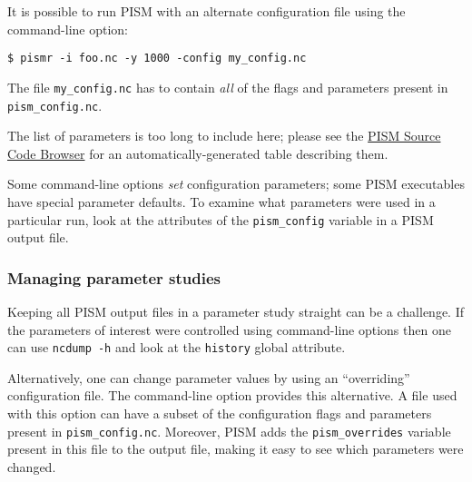 It is possible to run PISM with an alternate configuration file using the  command-line option:
\begin{verbatim}
$ pismr -i foo.nc -y 1000 -config my_config.nc
\end{verbatim}
The file \texttt{my_config.nc} has to contain \emph{all} of the flags and parameters present in \texttt{pism_config.nc}.

The list of parameters is too long to include here; please see the \href{http://www.pism-docs.org/doxy/html/index.html}{PISM Source Code Browser} for an automatically-generated table describing them.

Some command-line options \emph{set} configuration parameters; some PISM executables have special parameter defaults. To examine what parameters were used in a particular run, look at the attributes of the \texttt{pism_config} variable in a PISM output file.

\subsubsection*{Managing parameter studies}
\label{sec:parameter-studies}
Keeping all PISM output files in a parameter study straight can be a challenge.  If the parameters of interest were controlled using command-line options then one can use \texttt{ncdump -h} and look at the \texttt{history} global attribute.

Alternatively, one can change parameter values by using an ``overriding'' configuration file.  The  command-line option provides this alternative.  A file used with this option can have a subset of the configuration flags and parameters present in \texttt{pism_config.nc}. Moreover, PISM adds the \texttt{pism_overrides} variable present in this file to the output file, making it easy to see which parameters were changed.

